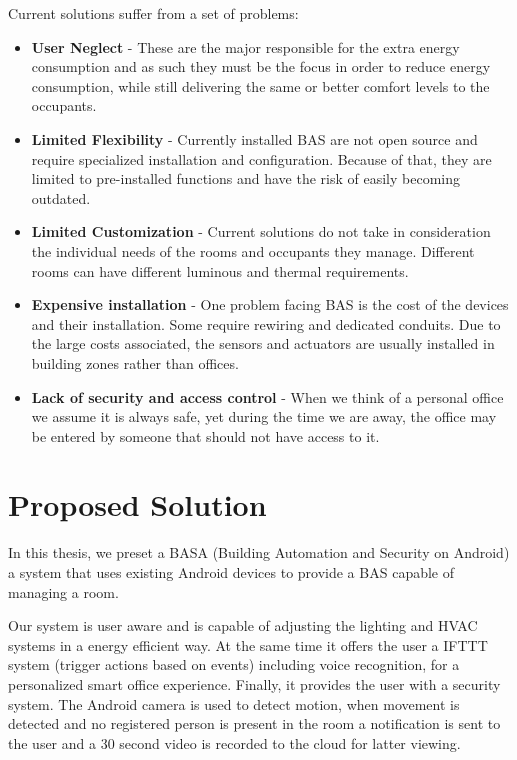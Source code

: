 Current solutions suffer from a set of problems:
\begin{itemize}
\item \textbf{User Neglect} - These are the major responsible for the extra energy consumption and as such they must be the focus in order to reduce energy consumption, while still delivering the same or better comfort levels to the occupants.
\item \textbf{Limited Flexibility} - Currently installed BAS are not open source and require specialized installation and configuration. Because of that, they are limited to pre-installed functions and have the risk of easily becoming outdated.
\item \textbf{Limited Customization} - Current solutions do not take in consideration the individual needs of the rooms and occupants they manage. Different rooms can have different luminous and thermal requirements. 
\item \textbf{Expensive installation} - One problem facing BAS is the cost of the devices and their installation. Some require rewiring  and dedicated conduits. Due to the large costs associated, the sensors and actuators are usually installed in building zones rather than offices.
\item \textbf{Lack of security and access control} - When we think of a personal office we assume it is always safe, yet during the time we are away, the office may be entered by someone that should not have access to it.  
\end{itemize}



\section{Proposed Solution}
\label{section:proposed}


In this thesis, we preset a BASA (Building Automation and Security on Android) a system that uses existing Android devices to provide a \ac{BAS} capable of managing a room. 

Our system is user aware and is capable of adjusting the lighting and \ac{HVAC} systems in a energy efficient way. At the same time it offers the user a \ac{IFTTT} system (trigger actions based on events) including voice recognition, for a personalized smart office experience. Finally, it provides the user with a security system. The Android camera is used to detect motion, when movement is detected and no registered person is present in the room a notification is sent to the user and a 30 second video is recorded to the cloud for latter viewing.


